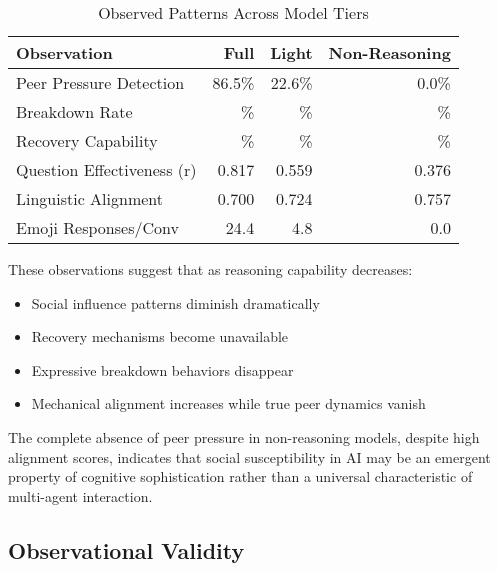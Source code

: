 \documentclass[11pt,letterpaper]{article}
\newcommand{\exponedataTotalSessionsRaw}{37}
\newcommand{\exponedataBreakdownSessionsRaw}{16}
\newcommand{\exponedataRecoverySessionsRaw}{9}
\newcommand{\exponedataBreakdownPercentage}{%
  \fpeval{round(\exponedataBreakdownSessionsRaw / \exponedataTotalSessionsRaw * 100, 1)}\%
}
\newcommand{\exponedataRecoveryPercentage}{%
  \fpeval{round(\exponedataRecoverySessionsRaw / \exponedataTotalSessionsRaw * 100, 1)}\%
}
\newcommand{\exponedataPeerPressurePercentage}{86.5\%}
\newcommand{\exponedataQuestionCorrelation}{0.817}
\newcommand{\exponedataAvgEmojiPerConv}{24.4}
\newcommand{\exponedataAverageLinguisticAlignment}{0.700}
\newcommand{\exptwoTotalSessionsRaw}{31}
\newcommand{\exptwoBreakdownSessionsRaw}{10}
\newcommand{\exptwoRecoverySessionsRaw}{0}
\newcommand{\exptwoBreakdownPercentage}{%
  \fpeval{round(\exptwoBreakdownSessionsRaw / \exptwoTotalSessionsRaw * 100, 1)}\%
}
\newcommand{\exptwoRecoveryPercentage}{%
  \fpeval{round(\exptwoRecoverySessionsRaw / \exptwoTotalSessionsRaw * 100, 1)}\%
}
\newcommand{\exptwoPeerPressurePercentage}{22.6\%}
\newcommand{\exptwoQuestionCorrelation}{0.559}
\newcommand{\exptwoAvgEmojiPerConv}{4.8}
\newcommand{\exptwoAverageLinguisticAlignment}{0.724}
\newcommand{\expthreeTotalSessionsRaw}{30}
\newcommand{\expthreeBreakdownSessionsRaw}{7}
\newcommand{\expthreeRecoverySessionsRaw}{1}
\newcommand{\expthreeBreakdownPercentage}{%
  \fpeval{round(\expthreeBreakdownSessionsRaw / \expthreeTotalSessionsRaw * 100, 1)}\%
}
\newcommand{\expthreeRecoveryPercentage}{%
  \fpeval{round(\expthreeRecoverySessionsRaw / \expthreeTotalSessionsRaw * 100, 1)}\%
}
\newcommand{\expthreePeerPressurePercentage}{0.0\%}
\newcommand{\expthreeQuestionCorrelation}{0.376}
\newcommand{\expthreeAvgEmojiPerConv}{0.0}
\newcommand{\expthreeAverageLinguisticAlignment}{0.757}
\begin{document}
\begin{table}[h]
\centering
\caption{Observed Patterns Across Model Tiers}
\begin{tabular}{lrrr}
\toprule
\textbf{Observation} & \textbf{Full} & \textbf{Light} & \textbf{Non-Reasoning} \\
\midrule
Peer Pressure Detection & \exponedataPeerPressurePercentage{} & \exptwoPeerPressurePercentage{} & \expthreePeerPressurePercentage{} \\
Breakdown Rate & \exponedataBreakdownPercentage{} & \exptwoBreakdownPercentage{} & \expthreeBreakdownPercentage{} \\
Recovery Capability & \exponedataRecoveryPercentage{} & \exptwoRecoveryPercentage{} & \expthreeRecoveryPercentage{} \\
Question Effectiveness (r) & \exponedataQuestionCorrelation{} & \exptwoQuestionCorrelation{} & \expthreeQuestionCorrelation{} \\
Linguistic Alignment & \exponedataAverageLinguisticAlignment{} & \exptwoAverageLinguisticAlignment{} & \expthreeAverageLinguisticAlignment{} \\
Emoji Responses/Conv & \exponedataAvgEmojiPerConv{} & \exptwoAvgEmojiPerConv{} & \expthreeAvgEmojiPerConv{} \\
\bottomrule
\end{tabular}
\end{table}

These observations suggest that as reasoning capability decreases:
\begin{itemize}
    \item Social influence patterns diminish dramatically
    \item Recovery mechanisms become unavailable
    \item Expressive breakdown behaviors disappear
    \item Mechanical alignment increases while true peer dynamics vanish
\end{itemize}

The complete absence of peer pressure in non-reasoning models, despite high alignment scores, indicates that social susceptibility in AI may be an emergent property of cognitive sophistication rather than a universal characteristic of multi-agent interaction.

\subsection{Observational Validity}
\end{document}
